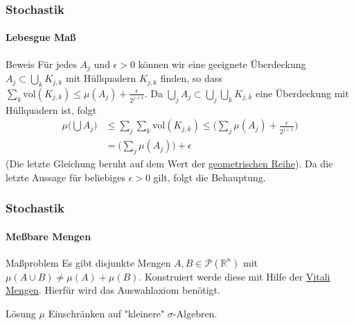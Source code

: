 \documentclass{beamer}
\begin{document}
\begin{frame}
    \frametitle{Stochastik}
\framesubtitle{Lebesgue Maß}
    \begin{block}{Beweis}
Für jedes $A_j$ und $\epsilon > 0$ können wir  eine geeignete Überdeckung  $A_j \subset \bigcup_k  K_{j,k}$ mit Hüllquadern $K_{j,k}$ finden, so dass 
 $\sum_k \text{vol} (K_{j,k}) \leq \mu(A_j) + \frac{\epsilon}{2^{j+1}}$.
Da $ \bigcup_j A_j \subset \bigcup_j \bigcup_k  K_{j,k}$ eine Überdeckung mit Hüllquadern ist, folgt
\begin{align*}
\mu \biggl (  \bigcup A_j  \biggr) & \leq \sum_j \sum_k \text{vol} (K_{j,k}) \leq  \bigl( \sum_j  \mu(A_j) + \frac{\epsilon}{2^{j+1}} \bigr)  \\
&= \bigl (\sum_j \mu(A_j) \bigr ) + \epsilon
\end{align*}
(Die letzte Gleichung beruht auf dem Wert der \href{https://de.wikipedia.org/wiki/Geometrische_Reihe}{geometrischen Reihe}).
Da die letzte Aussage für beliebiges $\epsilon > 0$ gilt, folgt die Behauptung.
\end{block}
 \end{frame}







\begin{frame}
    \frametitle{Stochastik}
\framesubtitle{Meßbare Mengen}
    \begin{block}{Maßproblem}
Es gibt disjunkte Mengen  $A,B \in \mathcal{P}(\mathbb{R}^n)$ mit $\mu(A \cup B) \neq \mu(A) + \mu(B)$. Konstruiert werde diese mit Hilfe der 
\href{https://www.youtube.com/watch?v=SJ8YoV6YZFA}{Vitali Mengen}. Hierfür wird das Auswahlaxiom benötigt.
\end{block}

    \begin{block}{Lösung}
$\mu$ Einschränken auf "kleinere" $\sigma$-Algebren.
\end{block}

 \end{frame}
\end{document}
